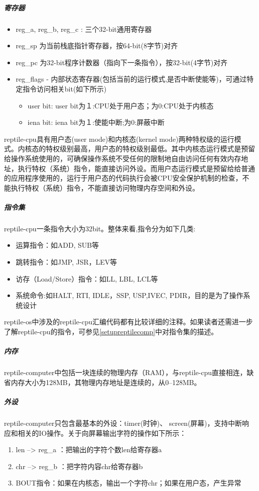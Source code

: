 \subparagraph{寄存器}

\begin{itemize}
	\item reg\_a, reg\_b, reg\_c : 三个32-bit通用寄存器
	\item reg\_sp 为当前栈底指针寄存器，按64-bit(8字节)对齐
	\item reg\_pc 为32-bit程序计数器（指向下一条指令），按32-bit(4字节)对齐
	\item reg\_flags - 内部状态寄存器(包括当前的运行模式,是否中断使能等)，可通过特定指令访问相关bit(如下所示)	
	\begin{itemize}
      \item  user bit: user bit为１:CPU处于用户态；为0:CPU处于内核态
      \item  iena bit: iena bit为１:使能中断;为0:屏蔽中断		
	\end{itemize}
\end{itemize}

reptile-cpu具有用户态(user mode)和内核态(kernel mode)两种特权级的运行模式。内核态的特权级别最高，用户态的特权级别最低。其中内核态运行模式是预留给操作系统使用的，可确保操作系统不受任何的限制地自由访问任何有效内存地址，执行特权（系统）指令，能直接访问外设。而用户态运行模式是预留给给普通的应用程序使用的，运行于用户态的代码执行会被CPU安全保护机制的检查，不能执行特权（系统）指令，不能直接访问物理内存空间和外设。

\subparagraph{指令集}
reptile-cpu一条指令大小为32bit。整体来看,指令分为如下几类:
\begin{itemize}
\item 运算指令：如ADD, SUB等
\item 跳转指令：如JMP, JSR，LEV等
\item 访存（Load/Store）指令：如LL, LBL, LCL等
\item 系统命令:如HALT, RTI, IDLE，SSP, USP,IVEC, PDIR，目的是为了操作系统设计
\end{itemize}

reptile-os中涉及的reptile-cpu汇编代码都有比较详细的注释。如果读者还需进一步了解reptile-cpu的指令，可参见\ref{setupreptilecomp}中对指令集的描述。

\subparagraph{内存}
reptile-computer中包括一块连续的物理内存（RAM），与reptile-cpu直接相连，缺省内存大小为128MB，其物理内存地址是连续的，从0--128MB。

\subparagraph{外设}

reptile-computer只包含最基本的外设：timer(时钟)、 screen(屏幕)，支持中断响应和相关的IO操作。关于向屏幕输出字符的操作如下所示：
\begin{enumerate}
\item len --> reg\_a ：把输出的字符个数len给寄存器a
\item chr --> reg\_b   ：把字符内容chr给寄存器b
\item BOUT指令：如果在内核态，输出一个字符chr；如果在用户态，产生异常
\end{enumerate}

